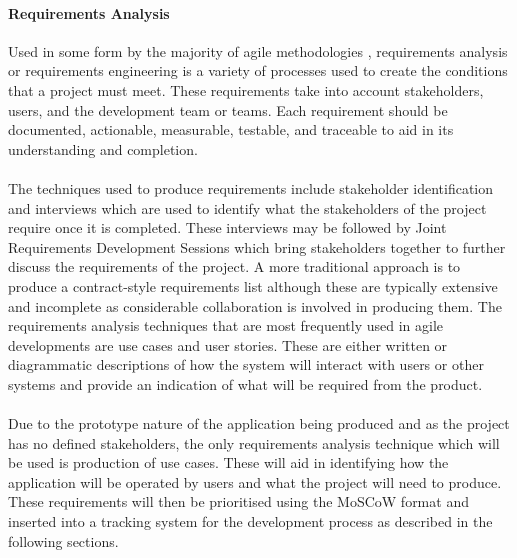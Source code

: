 		\paragraph{Requirements Analysis}
			Used in some form by the majority of agile methodologies \citep{cao2008agile}, requirements analysis or requirements engineering is a variety of processes used to create the conditions that a project must meet. These requirements take into account stakeholders, users, and the development team or teams. Each requirement should be documented, actionable, measurable, testable, and traceable to aid in its understanding and completion.
			\\\\
			The techniques used to produce requirements include stakeholder identification and interviews which are used to identify what the stakeholders of the project require once it is completed. These interviews may be followed by Joint Requirements Development Sessions which bring stakeholders together to further discuss the requirements of the project. A more traditional approach is to produce a contract-style requirements list although these are typically  extensive and incomplete as considerable collaboration is involved in producing them.  The  requirements analysis techniques that are most frequently used in agile developments are use cases and user stories. These are either written or diagrammatic descriptions of how the system will interact with users or other systems and provide an indication of what will be required from the product.
			\\\\
			Due to the prototype nature of the application being produced and as the project has no defined stakeholders, the only requirements analysis technique which will be used is production of use cases. These will aid in identifying how the application will be operated by users and what the project will need to produce. These requirements will then be prioritised using the MoSCoW format and inserted into a tracking system for the development process as  described in the following sections.
